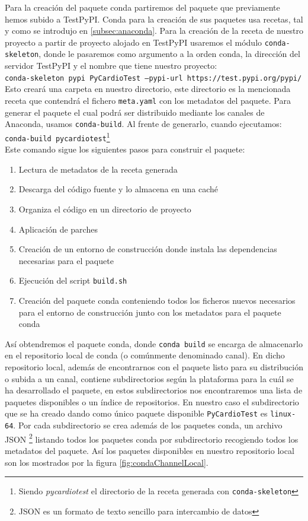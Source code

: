 Para la creación del paquete conda partiremos del paquete que previamente hemos subido a TestPyPI. Conda para la creación de sus paquetes usa recetas, tal y como se introdujo en \ref{subsec:anaconda}. Para la creación de la receta de nuestro proyecto a partir de proyecto alojado en TestPyPI usaremos el módulo \texttt{conda-skeleton}, donde le pasaremos como argumento a la orden conda, la dirección del servidor TestPyPI y el nombre que tiene nuestro proyecto: \\
\texttt{conda-skeleton pypi PyCardioTest --pypi-url https://test.pypi.org/pypi/} \\
Esto creará una carpeta en nuestro directorio, este directorio es la mencionada receta que contendrá el fichero \texttt{meta.yaml} con los metadatos del paquete. Para generar el paquete el cual podrá ser distribuido mediante los canales de Anaconda, usamos \texttt{conda-build}. Al frente de generarlo, cuando ejecutamos: \\
\texttt{conda-build pycardiotest}\footnote{Siendo \textit{pycardiotest} el directorio de la receta generada con \texttt{conda-skeleton}} \\
Este comando sigue los siguientes pasos para construir el paquete:
\begin{enumerate}
    \item Lectura de metadatos de la receta generada
    \item Descarga del código fuente y lo almacena en una caché
    \item Organiza el código en un directorio de proyecto
    \item Aplicación de parches
    \item Creación de un entorno de construcción donde instala las dependencias necesarias para el paquete
    \item Ejecución del script \texttt{build.sh}
    \item Creación del paquete conda conteniendo todos los ficheros nuevos necesarios para el entorno de construcción junto con los metadatos para el paquete conda
\end{enumerate}
Así obtendremos el paquete conda, donde \texttt{conda build} se encarga de almacenarlo en el repositorio local de conda (o comúnmente denominado canal). En dicho repositorio local, además de encontrarnos con el paquete listo para su distribución o subida a un canal, contiene subdirectorios según la plataforma para la cuál se ha desarrollado el paquete, en estos subdirectorios nos encontraremos una lista de paquetes disponibles o un índice de repositorios. En nuestro caso el subdirectorio que se ha creado dando como único paquete disponible \texttt{PyCardioTest} es \texttt{linux-64}. Por cada subdirectorio se crea además de los paquetes conda, un archivo JSON \footnote{JSON es un formato de texto sencillo para intercambio de datos} listando todos los paquetes conda por subdirectorio recogiendo todos los metadatos del paquete. Así los paquetes disponibles en nuestro repositorio local son los mostrados por la figura \ref{fig:condaChannelLocal}. 

